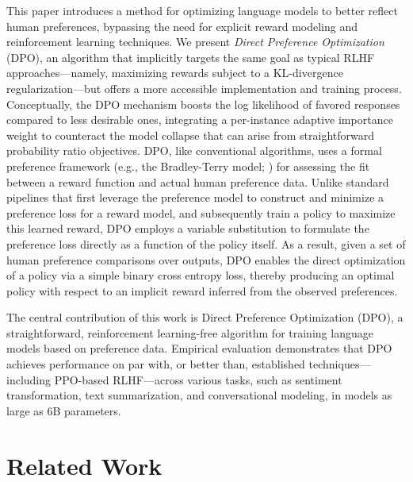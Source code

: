 This paper introduces a method for optimizing language models to better reflect human preferences, bypassing the need for explicit reward modeling and reinforcement learning techniques. We present \textit{Direct Preference Optimization} (DPO), an algorithm that implicitly targets the same goal as typical RLHF approaches—namely, maximizing rewards subject to a KL-divergence regularization—but offers a more accessible implementation and training process. Conceptually, the DPO mechanism boosts the log likelihood of favored responses compared to less desirable ones, integrating a per-instance adaptive importance weight to counteract the model collapse that can arise from straightforward probability ratio objectives. DPO, like conventional algorithms, uses a formal preference framework (e.g., the Bradley-Terry model; \cite{bradley1952rankanalysis}) for assessing the fit between a reward function and actual human preference data. Unlike standard pipelines that first leverage the preference model to construct and minimize a preference loss for a reward model, and subsequently train a policy to maximize this learned reward, DPO employs a variable substitution to formulate the preference loss directly as a function of the policy itself. As a result, given a set of human preference comparisons over outputs, DPO enables the direct optimization of a policy via a simple binary cross entropy loss, thereby producing an optimal policy with respect to an implicit reward inferred from the observed preferences.

The central contribution of this work is Direct Preference Optimization (DPO), a straightforward, reinforcement learning-free algorithm for training language models based on preference data. Empirical evaluation demonstrates that DPO achieves performance on par with, or better than, established techniques—including PPO-based RLHF—across various tasks, such as sentiment transformation, text summarization, and conversational modeling, in models as large as 6B parameters.

\section{Related Work}

